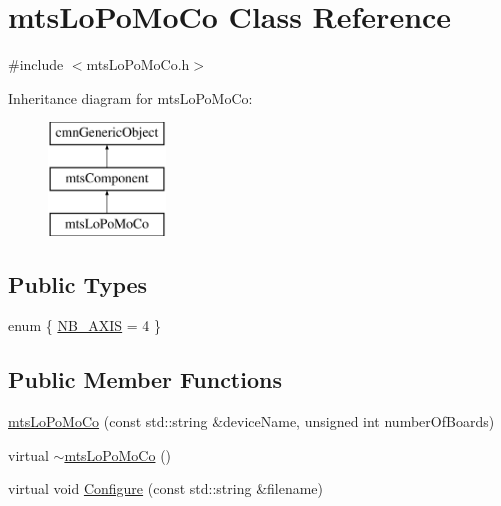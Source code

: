\hypertarget{classmts_lo_po_mo_co}{}\section{mts\+Lo\+Po\+Mo\+Co Class Reference}
\label{classmts_lo_po_mo_co}


{\ttfamily \#include $<$mts\+Lo\+Po\+Mo\+Co.\+h$>$}

Inheritance diagram for mts\+Lo\+Po\+Mo\+Co\+:\begin{figure}[H]
\begin{center}
\leavevmode
\includegraphics[height=3.000000cm]{d9/d04/classmts_lo_po_mo_co}
\end{center}
\end{figure}
\subsection*{Public Types}
\begin{DoxyCompactItemize}
\item 
enum \{ \hyperlink{classmts_lo_po_mo_co_a933389a16a909530cb872cb7e2a03e4eac6dba0b930a9af0a1804587423ca4878}{N\+B\+\_\+\+A\+X\+I\+S} = 4
 \}
\end{DoxyCompactItemize}
\subsection*{Public Member Functions}
\begin{DoxyCompactItemize}
\item 
\hyperlink{classmts_lo_po_mo_co_a43e47d59bc0d7c596393e6cde9925102}{mts\+Lo\+Po\+Mo\+Co} (const std\+::string \&device\+Name, unsigned int number\+Of\+Boards)
\item 
virtual \hyperlink{classmts_lo_po_mo_co_a2f64ffac304c55dd2f63896711cf23d7}{$\sim$mts\+Lo\+Po\+Mo\+Co} ()
\item 
virtual void \hyperlink{classmts_lo_po_mo_co_aa597d72647d0187b9f601973a7a1077b}{Configure} (const std\+::string \&filename)
\end{DoxyCompactItemize}
